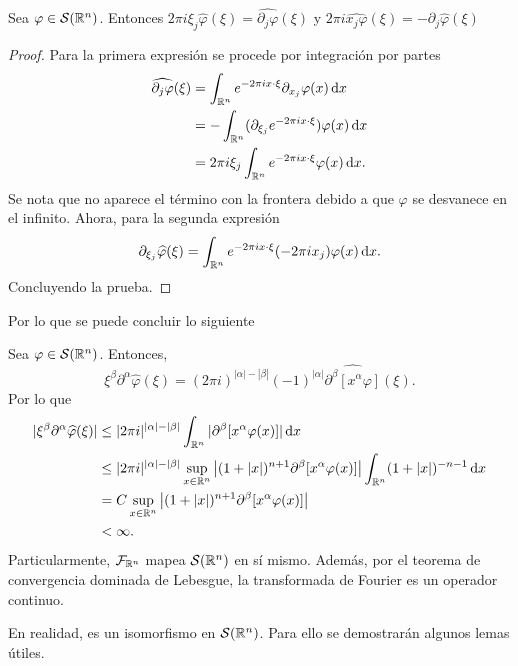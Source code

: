 \begin{theorem}
    Sea $\varphi\in\mathcal{S}(\mathbb{R}^n)$. Entonces $2\pi i\xi_j\widehat{\varphi}(\xi)
    = \widehat{\partial_j\varphi}(\xi)$ y 
    $ 2\pi i \widehat{x_j\varphi}(\xi) = - \partial_j\widehat{\varphi}(\xi)$
\end{theorem}
\begin{proof}
    Para la primera expresión se procede por integración por partes
    \begin{align*}
        \widehat{\partial_j\varphi}(\xi) & = \int_{\mathbb{R}^n} e^{-2\pi i x\cdot \xi} 
        \partial_{x_j}\varphi(x) \mathop{}\!\mathrm{d} x \\
        & = - \int_{\mathbb{R}^n} (\partial_{\xi_j} e^{-2\pi i x\cdot \xi}) 
        \varphi(x) \mathop{}\!\mathrm{d} x\\
        & = 2\pi i \xi_j \int_{\mathbb{R}^n} e^{-2\pi i x\cdot \xi} 
        \varphi(x) \mathop{}\!\mathrm{d} x.
    \end{align*}
    Se nota que no aparece el término con la frontera debido a que $\varphi$ 
    se desvanece en el infinito. Ahora, para la segunda expresión 
    \begin{equation*}
        \partial_{\xi_j} \widehat{\varphi}(\xi) = 
        \int_{\mathbb{R}^n}  e^{-2\pi i x\cdot \xi} (-2\pi i x_j)
        \varphi(x) \mathop{}\!\mathrm{d} x.
    \end{equation*}
    Concluyendo la prueba.
\end{proof}
Por lo que se puede concluir lo siguiente 
\begin{corollary}
    Sea $\varphi\in\mathcal{S}(\mathbb{R}^n)$. Entonces, 
    \begin{equation*}
        \xi^\beta \partial^\alpha \widehat{\varphi}(\xi) = 
        (2\pi i)^{|\alpha|-|\beta|} (-1)^{|\alpha|} \widehat{\partial^\beta 
        [x^\alpha \varphi]}(\xi).
    \end{equation*}
    Por lo que 
    \begin{align*}
        |\xi^\beta \partial^\alpha \widehat{\varphi}(\xi)| & \leq 
        |2\pi i|^{|\alpha|-|\beta|} \int_{\mathbb{R}^n} |\partial^\beta 
        [x^\alpha \varphi(x)]| \mathop{}\!\mathrm{d} x \\
        & \leq |2\pi i|^{|\alpha|-|\beta|} \sup_{x\in\mathbb{R}^n} 
        \left|(1+|x|)^{n+1} \partial^\beta 
        [x^\alpha \varphi(x)]\right| \int_{\mathbb{R}^n} (1+|x|)^{-n-1}\mathop{}\!\mathrm{d} x \\
        & = C \sup_{x\in\mathbb{R}^n} \left|(1+|x|)^{n+1} \partial^\beta 
        [x^\alpha \varphi(x)]\right| \\
        & < \infty.
    \end{align*}
    Particularmente, $\mathcal{F}_{\mathbb{R}^n}$ mapea $\mathcal{S}(\mathbb{R}^n)$ en sí 
    mismo. Además, por el teorema de convergencia dominada de Lebesgue, 
    la transformada de Fourier es un operador continuo.
\end{corollary}
En realidad, es un isomorfismo en $\mathcal{S}(\mathbb{R}^n)$. Para ello se demostrarán 
algunos lemas útiles.

